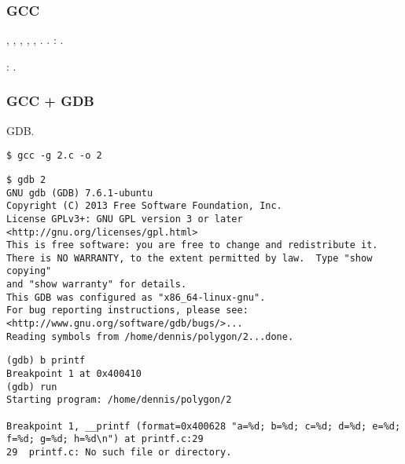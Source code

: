 \ifdefined\IncludeGCC
\subsubsection{GCC}

 \RDI, \RSI,
\RDX, \RCX, , .
.
: .

: .



\ifdefined\IncludeGDB
\subsubsection{GCC + GDB}

 \ac{GDB}.

\begin{lstlisting}
$ gcc -g 2.c -o 2
\end{lstlisting}

\begin{lstlisting}
$ gdb 2
GNU gdb (GDB) 7.6.1-ubuntu
Copyright (C) 2013 Free Software Foundation, Inc.
License GPLv3+: GNU GPL version 3 or later <http://gnu.org/licenses/gpl.html>
This is free software: you are free to change and redistribute it.
There is NO WARRANTY, to the extent permitted by law.  Type "show copying"
and "show warranty" for details.
This GDB was configured as "x86_64-linux-gnu".
For bug reporting instructions, please see:
<http://www.gnu.org/software/gdb/bugs/>...
Reading symbols from /home/dennis/polygon/2...done.
\end{lstlisting}

\begin{lstlisting}[caption=\RU{ставим брякпойнт на \printf{,} запускаем}\EN{let's set the breakpoint to \printf{,} and run}]
(gdb) b printf
Breakpoint 1 at 0x400410
(gdb) run
Starting program: /home/dennis/polygon/2 

Breakpoint 1, __printf (format=0x400628 "a=%d; b=%d; c=%d; d=%d; e=%d; f=%d; g=%d; h=%d\n") at printf.c:29
29	printf.c: No such file or directory.
\end{lstlisting}

